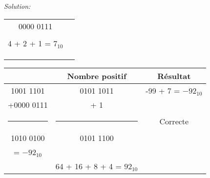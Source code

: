 \documentclass{article}
\newenvironment{solution}
    {\textit{Solution:}}
    {}
\begin{document}
\begin{solution}
\begin{itemize}
        \hspace{40pt}
        
        \begin{tabular}{|c|c|}
        \hline
        &\\
        \hline    
        0000 0111                   &              \\
                                    &          \\
        4 + 2 + 1 = $7_{10}$        &           \\
        \hspace{5pt}                &                 \\
        \hspace{100pt}              &       \hspace{100pt}      \\
                                    &           \\
        \hline
        \end{tabular}
        
        \hspace{40pt}
        
        \begin{tabular}{|c|c|c|}
        \hline
        & Nombre positif & Résultat \\
        \hline
        \hspace{6pt}1001 1101       &     0101 1011        &       -99 + 7 = $-92_{10}$         \\
        +0000 0111                  &     + \hspace{25pt} 1      &                                         \\
        \rule{1in}{1pt}             &     \rule{1in}{1pt}   &       Correcte                          \\
        1010 0100                   &      0101 1100        &                                         \\
        \hspace{33pt} = $-92_{10}$ \hspace{30pt}  &  \hspace{100pt}       &                  \\
                                   &     64 + 16 + 8 + 4 = $92_{10}$       &      \hspace{100pt}                     \\
        \hline
        \end{tabular}    
        
        
    \end{itemize}    

\end{solution}
\end{document}
